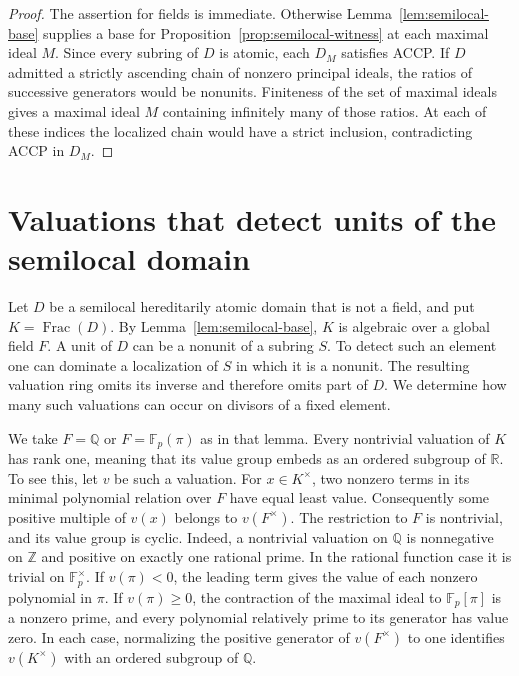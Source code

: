\documentclass[11pt, letterpaper]{article}
\theoremstyle{definition}
\theoremstyle{remark}
\DeclareMathOperator{\Frac}{Frac}
\begin{document}
\begin{proof}
    The assertion for fields is immediate.
    Otherwise Lemma~\ref{lem:semilocal-base} supplies a base for Proposition~\ref{prop:semilocal-witness} at each maximal ideal $M$.
    Since every subring of $D$ is atomic, each $D_{M}$ satisfies ACCP.
    If $D$ admitted a strictly ascending chain of nonzero principal ideals, the ratios of successive generators would be nonunits.
    Finiteness of the set of maximal ideals gives a maximal ideal $M$ containing infinitely many of those ratios.
    At each of these indices the localized chain would have a strict inclusion, contradicting ACCP in $D_{M}$.
\end{proof}

\section{Valuations that detect units of the semilocal domain}
\label{sec:places}

Let $D$ be a semilocal hereditarily atomic domain that is not a field, and put $K = \Frac(D)$.
By Lemma~\ref{lem:semilocal-base}, $K$ is algebraic over a global field $F$.
A unit of $D$ can be a nonunit of a subring $S$.
To detect such an element one can dominate a localization of $S$ in which it is a nonunit.
The resulting valuation ring omits its inverse and therefore omits part of $D$.
We determine how many such valuations can occur on divisors of a fixed element.

We take $F = \mathbb{Q}$ or $F = \mathbb{F}_p(\pi)$ as in that lemma.
Every nontrivial valuation of $K$ has rank one, meaning that its value group embeds as an ordered subgroup of $\mathbb{R}$.
To see this, let $v$ be such a valuation.
For $x \in K^{\times}$, two nonzero terms in its minimal polynomial relation over $F$ have equal least value.
Consequently some positive multiple of $v(x)$ belongs to $v(F^{\times})$.
The restriction to $F$ is nontrivial, and its value group is cyclic.
Indeed, a nontrivial valuation on $\mathbb{Q}$ is nonnegative on $\mathbb{Z}$ and positive on exactly one rational prime.
In the rational function case it is trivial on $\mathbb{F}_p^{\times}$.
If $v(\pi) < 0$, the leading term gives the value of each nonzero polynomial in $\pi$.
If $v(\pi) \ge 0$, the contraction of the maximal ideal to $\mathbb{F}_p[\pi]$ is a nonzero prime, and every polynomial relatively prime to its generator has value zero.
In each case, normalizing the positive generator of $v(F^{\times})$ to one identifies $v(K^{\times})$ with an ordered subgroup of $\mathbb{Q}$.
\end{document}
